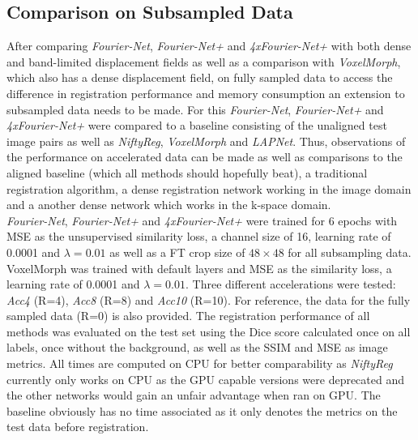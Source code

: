 \documentclass[english,version-2022-01]{uzl-thesis} %
\begin{document}
\subsection{Comparison on Subsampled Data} \label{SubSec:ComparisonSubsampling}
After comparing \emph{Fourier-Net}, \emph{Fourier-Net+} and \emph{4xFourier-Net+} with both dense and band-limited displacement fields as well as a comparison with \emph{VoxelMorph}, which also has a dense displacement field, on fully sampled data to access the difference in registration performance and memory consumption an extension to subsampled data needs to be made. For this \emph{Fourier-Net}, \emph{Fourier-Net+} and \emph{4xFourier-Net+} were compared to a baseline consisting of the unaligned test image pairs as well as \emph{NiftyReg}, \emph{VoxelMorph} and \emph{LAPNet}. Thus, observations of the performance on accelerated data can be made as well as comparisons to the aligned baseline (which all methods should hopefully beat), a traditional registration algorithm, a dense registration network working in the image domain and a another dense network which works in the k-space domain.\\
\emph{Fourier-Net}, \emph{Fourier-Net+} and \emph{4xFourier-Net+} were trained for 6 epochs with MSE as the unsupervised similarity loss, a channel size of 16, learning rate of 0.0001 and $\lambda=0.01$ as well as a FT crop size of $48 \times 48$ for all subsampling data. VoxelMorph was trained with default layers and MSE as the similarity loss, a learning rate of 0.0001 and $\lambda=0.01$. Three different accelerations were tested: \textit{Acc4} (R=4), \textit{Acc8} (R=8) and \textit{Acc10} (R=10). For reference, the data for the fully sampled data (R=0) is also provided. The registration performance of all methods was evaluated on the test set using the Dice score calculated once on all labels, once without the background, as well as the SSIM and MSE as image metrics. All times are computed on CPU for better comparability as \emph{NiftyReg} currently only works on CPU as the GPU capable versions were deprecated and the other networks would gain an unfair advantage when ran on GPU. The baseline obviously has no time associated as it only denotes the metrics on the test data before registration.
\end{document}
